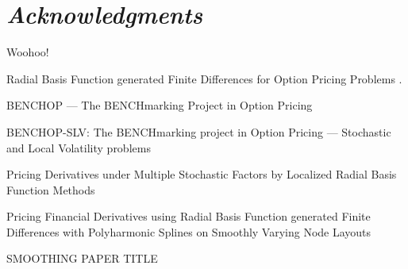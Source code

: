 \documentclass{UUThesisTemplate}
\begin{document}
{\myfont
\chapter*{\emph{Acknowledgments}}
{\noteunic
Woohoo!
}
}
    \begin{listofpapers}
    \item Radial Basis Function generated Finite Differences for Option Pricing Problems \cite{paper1}. \label{paper1}
    \item BENCHOP --- The BENCHmarking Project in Option Pricing  \label{paper2}
    \item BENCHOP-SLV: The BENCHmarking project in Option Pricing --- Stochastic and Local Volatility problems \label{paper4}
    \item Pricing Derivatives under Multiple Stochastic Factors by Localized Radial Basis Function Methods \label{paper3}
    \item Pricing Financial Derivatives using Radial Basis Function generated Finite Differences with Polyharmonic Splines on Smoothly Varying Node Layouts \label{paper5}
    \item SMOOTHING PAPER TITLE \label{paper6}
    \end{listofpapers}


    \begingroup
        \tableofcontents
    \endgroup

\mainmatter
%    
%    
%    

%    
%
%
\end{document}
